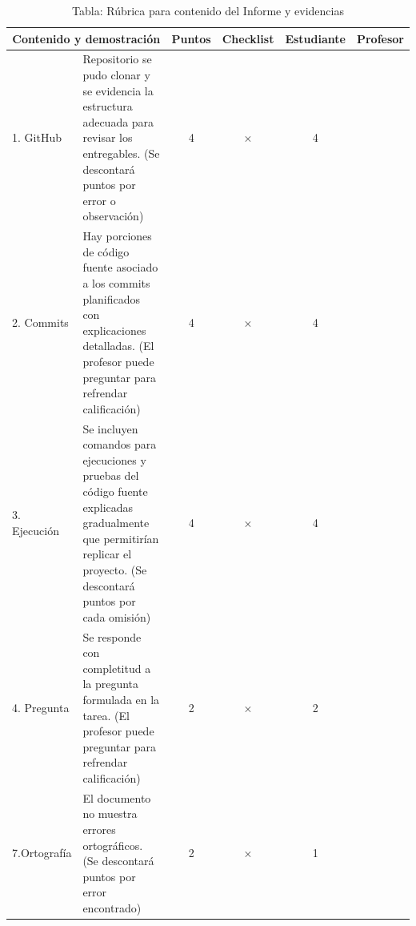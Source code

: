 \documentclass{article}
\begin{document}
\begin{table}[H]
	\centering
	\caption{Tabla: Rúbrica para contenido del Informe y evidencias}
	\begin{tabular}{|p{2cm}|p{6cm}|c|c|c|c|}
		\hline
		\multicolumn{2}{|c|}{\textbf{Contenido y demostración}} & \textbf{Puntos}                                                                                                                                                                                                                                                                  & \textbf{Checklist} & \textbf{Estudiante} & \textbf{Profesor}   \\ \hline
		1. GitHub                                               & Repositorio se pudo clonar y se evidencia la estructura adecuada para revisar los entregables. (Se descontará puntos por error o observación)                                                                                                                                    & 4                  & ×                   & 4                 & \\ \hline
		2. Commits                                              & Hay porciones de código fuente asociado a los commits planificados con explicaciones detalladas. (El profesor puede preguntar para refrendar calificación)                                                                                                                       & 4                  & ×                   & 4                 & \\ \hline
		3. Ejecución                                            & Se incluyen comandos para ejecuciones y pruebas del código fuente explicadas gradualmente que permitirían replicar el proyecto. (Se descontará puntos por cada omisión)                                                                                                          & 4                  & ×                   & 4                 & \\ \hline
		4. Pregunta                                             & Se responde con completitud a la pregunta formulada en la tarea. (El profesor puede preguntar para refrendar calificación)                                                                                                                                                       & 2                  & ×                   & 2                 & \\ \hline
		7.Ortografía                                            & El documento no muestra errores ortográficos. (Se descontará puntos por error encontrado)                                                                                                                                                                                        & 2                  & ×                   & 1                 & \\ \hline

\end{tabular}
\end{table}
\end{document}

